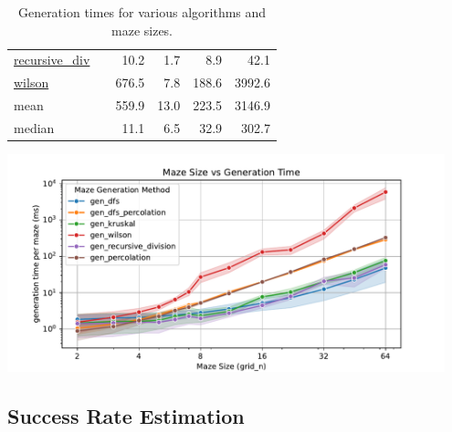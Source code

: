 \documentclass[10pt,a4paper,onecolumn]{article}
\let\origfigure\figure
\let\endorigfigure\endfigure
\renewenvironment{figure}[1][2] {
    \expandafter\origfigure\expandafter[H]
} {
    \endorigfigure
}
\begin{document}
\begin{table}[H]
\begin{tabular}{|ll|r|rrr|}
  \href{https://understanding-search.github.io/maze-dataset/maze_dataset.html\#LatticeMazeGenerators.gen_recursive_division}{recursive\_div}
          &                        &   10.2   &    1.7   &    8.9   &   42.1   \\
  \href{https://understanding-search.github.io/maze-dataset/maze_dataset.html\#LatticeMazeGenerators.gen_wilson}{wilson}
          &                        &  676.5   &    7.8   &  188.6   & 3992.6   \\
  \hline\hline
  mean
          &                        &  559.9   &   13.0   &  223.5   & 3146.9   \\
  median
          &                        &   11.1   &    6.5   &   32.9   &  302.7   \\
  \hline
\end{tabular}
\caption{Generation times for various algorithms and maze sizes.}
\label{tab:benchmarks}
\end{table}

\begin{figure}
\hypertarget{fig:benchmarks}{%
\centering
\includegraphics[width=0.95\textwidth,height=\textheight]{figures/benchmarks/gridsize-vs-gentime.pdf}
\caption{Plot of maze generation time. Generation time scales
exponentially with maze size for all algorithms. Generation time per
maze does not depend on the number of mazes being generated, and there
is minimal overhead to initializing the generation process for a small
dataset. Wilson's algorithm is notably less efficient than others and
has high variance. Note that values are averaged across all parameter
sets for that algorithm.}\label{fig:benchmarks}
}
\end{figure}

\hypertarget{success-rate-estimation}{%
\subsection{Success Rate Estimation}\label{success-rate-estimation}}
\end{document}
